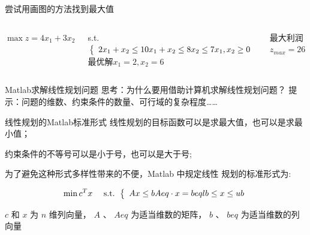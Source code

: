\documentclass[xcolor=table,dvipsnames,svgnames,aspectratio=169,fontset=ubuntu]{ctexbeamer}
\let\\\relax
\begin{document}
\begin{frame}{尝试用画图的方法找到最大值}
  \begin{columns}

    $\max z=4 x_1+3 x_2$

    \vskip 15pt
    s.t. $\left\{\begin{array}{l}2 x_1+x_2 \leq 10 \\ x_1+x_2 \leq 8 \\ x_2 \leq 7 \\ x_1, x_2 \geq 0\end{array}\right.$
    \vskip 15pt
    最优解$x_1=2,x_2=6$
    
    最大利润$z_{max}=26$
    \begin{figure}
      \centering
      \includegraphics[width=1.2\textwidth]{绘图法.png}
    \end{figure}
  \end{columns}
\end{frame}

\begin{frame}{Matlab求解线性规划问题}
思考：为什么要用借助计算机求解线性规划问题？
\vskip 20pt
提示：问题的维数、约束条件的数量、可行域的复杂程度……
\end{frame}


\begin{frame}{线性规划的Matlab标准形式}
  线性规划的目标函数可以是求最大值，也可以是求最小值；
  
  约束条件的不等号可以是小于号，也可以是大于号;
  
  为了避免这种形式多样性带来的不便，Matlab 中规定线性
规划的标准形式为:

$$\begin{aligned} & \min c^T x \\ & \text { s.t. }\left\{\begin{array}{l}A x \leq b \\ A e q \cdot x=b e q \\ l b \leq x \leq u b\end{array}\right.\end{aligned}$$

\vskip 10pt
$c$ 和 $x$ 为 $n$ 维列向量， $A$ 、 $Aeq$ 为适当维数的矩阵， $b$ 、 $beq$ 为适当维数的列向量

\end{frame}
\end{document}
